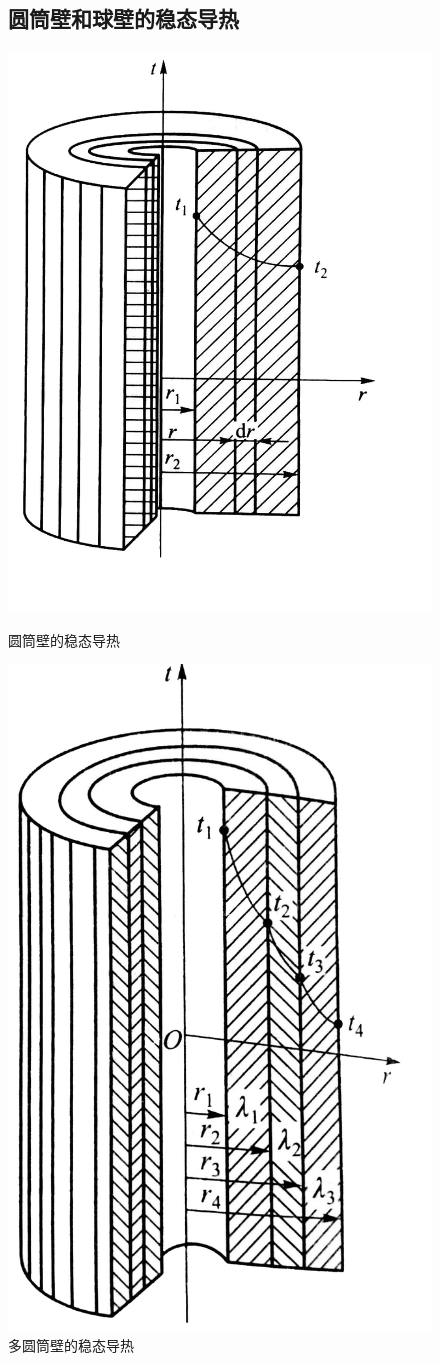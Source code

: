\begin{figure}[!htb]
	\subsection{圆筒壁和球壁的稳态导热}
	\vspace*{-2em}
\end{figure}
\begin{figure}[!htb]
	\begin{minipage}{0.5\linewidth}
	\centering
	\includegraphics[width=0.5\linewidth]{pic/圆筒壁.jpeg}
	\vspace*{-2em}
	\caption{圆筒壁的稳态导热}
	\label{圆筒壁}
	\end{minipage}
	\begin{minipage}{0.5\linewidth}
		\centering
		\includegraphics[width=0.4\linewidth]{pic/多圆筒壁.jpeg}
		\vspace*{-1.5em}
		\caption{多圆筒壁的稳态导热}
		\label{多圆筒壁}
	\end{minipage}
\end{figure}
